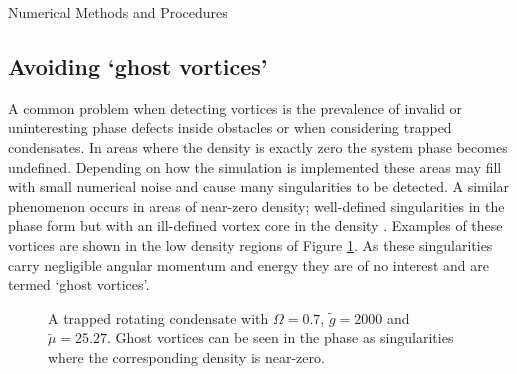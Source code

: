 \begin{chapter}{\label{cha:numerics}Numerical Methods and Procedures}
\subsection{\label{section:ghostvortex} Avoiding `ghost vortices'}
A common problem when detecting vortices is the prevalence of invalid or uninteresting phase defects inside obstacles or when considering trapped condensates. In areas where the density is exactly zero the system phase becomes undefined. Depending on how the simulation is implemented these areas may fill with small numerical noise and cause many singularities to be detected. A similar phenomenon occurs in areas of near-zero density; well-defined singularities in the phase form but with an ill-defined vortex core in the density \cite{tsubota_kasamatsu_02}. Examples of these vortices are shown in the low density regions of Figure \ref{fig:ghostvortex}. As these singularities carry negligible angular momentum and energy they are of no interest and are termed `ghost vortices'.
\begin{figure}[!ht]
  \centering
  \caption{A trapped rotating condensate with $\Omega=0.7$, $\tilde{g}=2000$ and $\tilde{\mu}=25.27$. Ghost vortices can be seen in the phase as singularities where the corresponding density is near-zero.\label{fig:ghostvortex}}
 \end{figure}


\end{chapter}
